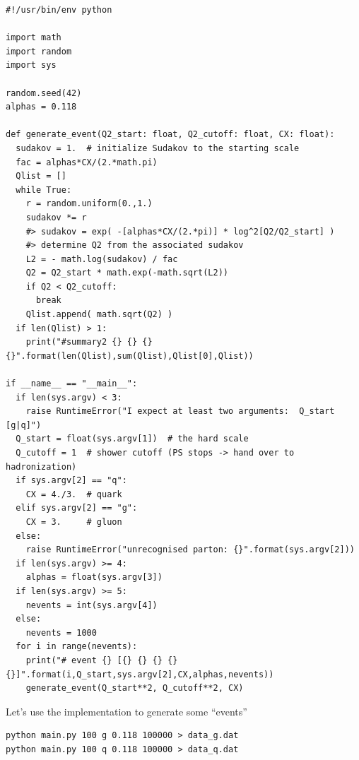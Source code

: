 \documentclass[11pt]{article}
\begin{document}
\begin{verbatim}
#!/usr/bin/env python

import math
import random
import sys

random.seed(42)
alphas = 0.118

def generate_event(Q2_start: float, Q2_cutoff: float, CX: float):
  sudakov = 1.  # initialize Sudakov to the starting scale
  fac = alphas*CX/(2.*math.pi)
  Qlist = []
  while True:
    r = random.uniform(0.,1.)
    sudakov *= r
    #> sudakov = exp( -[alphas*CX/(2.*pi)] * log^2[Q2/Q2_start] )
    #> determine Q2 from the associated sudakov
    L2 = - math.log(sudakov) / fac
    Q2 = Q2_start * math.exp(-math.sqrt(L2))
    if Q2 < Q2_cutoff:
      break
    Qlist.append( math.sqrt(Q2) )
  if len(Qlist) > 1:
    print("#summary2 {} {} {} {}".format(len(Qlist),sum(Qlist),Qlist[0],Qlist))

if __name__ == "__main__":
  if len(sys.argv) < 3:
    raise RuntimeError("I expect at least two arguments:  Q_start [g|q]")
  Q_start = float(sys.argv[1])  # the hard scale
  Q_cutoff = 1  # shower cutoff (PS stops -> hand over to hadronization)
  if sys.argv[2] == "q":
    CX = 4./3.  # quark
  elif sys.argv[2] == "g":
    CX = 3.     # gluon
  else:
    raise RuntimeError("unrecognised parton: {}".format(sys.argv[2]))
  if len(sys.argv) >= 4:
    alphas = float(sys.argv[3])
  if len(sys.argv) >= 5:
    nevents = int(sys.argv[4])
  else:
    nevents = 1000
  for i in range(nevents):
    print("# event {} [{} {} {} {} {}]".format(i,Q_start,sys.argv[2],CX,alphas,nevents))
    generate_event(Q_start**2, Q_cutoff**2, CX)
\end{verbatim}

Let's use the implementation to generate some ``events''
\begin{verbatim}
python main.py 100 g 0.118 100000 > data_g.dat
python main.py 100 q 0.118 100000 > data_q.dat
\end{verbatim}
\end{document}
